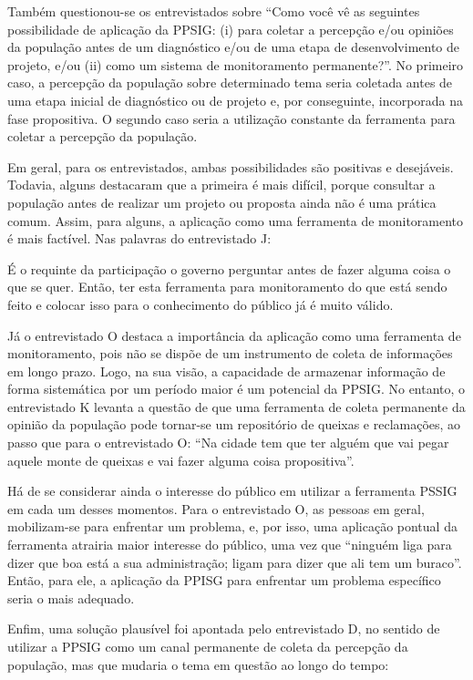 \documentclass{article}
\begin{document}
\begin{multicols}{2}
Também questionou-se os entrevistados sobre “Como você vê as seguintes
possibilidade de aplicação da PPSIG: (i) para coletar a percepção e/ou
opiniões da população antes de um diagnóstico e/ou de uma etapa de
desenvolvimento de projeto, e/ou (ii) como um sistema de monitoramento
permanente?”. No primeiro caso, a percepção da população sobre
determinado tema seria coletada antes de uma etapa inicial de diagnóstico ou de
projeto e, por conseguinte, incorporada na fase propositiva. O segundo caso
seria a utilização constante da ferramenta para coletar a percepção da
população.

Em geral, para os entrevistados, ambas possibilidades são positivas e
desejáveis.
Todavia, alguns destacaram que a primeira é mais difícil, porque consultar a
população antes de realizar um projeto ou proposta ainda não é uma prática
comum. Assim, para alguns, a aplicação como uma ferramenta de monitoramento é
mais factível. Nas palavras do entrevistado J:

É o requinte da participação o governo perguntar antes de fazer alguma coisa
o que se quer. Então, ter esta ferramenta para monitoramento do que está
sendo feito e colocar isso para o conhecimento do público já é muito válido.

Já o entrevistado O destaca a importância da aplicação como uma ferramenta de
monitoramento, pois não se dispõe de um instrumento de coleta de informações em
longo prazo. Logo, na sua visão, a capacidade de armazenar informação de forma
sistemática por um período maior é um potencial da PPSIG. No entanto, o
entrevistado K levanta a questão de que uma ferramenta de coleta permanente da
opinião da população pode tornar-se um repositório de queixas e reclamações, ao
passo que para o entrevistado O: “Na cidade tem que ter alguém que vai
pegar aquele monte de queixas e vai fazer alguma coisa
propositiva”.

Há de se considerar ainda o interesse do público em utilizar a ferramenta PSSIG
em cada um desses momentos. Para o entrevistado O, as pessoas em geral,
mobilizam-se para enfrentar um problema, e, por isso, uma aplicação pontual da
ferramenta atrairia maior interesse do público, uma vez que “ninguém
liga para dizer que boa está a sua administração; ligam para dizer que ali
tem um buraco”. Então, para ele, a aplicação da PPISG para
enfrentar um problema específico seria o mais adequado.

Enfim, uma solução plausível foi apontada pelo entrevistado D, no sentido de
utilizar a PPSIG como um canal permanente de coleta da percepção da população,
mas que mudaria o tema em questão ao longo do tempo:


\end{multicols}
\end{document}
